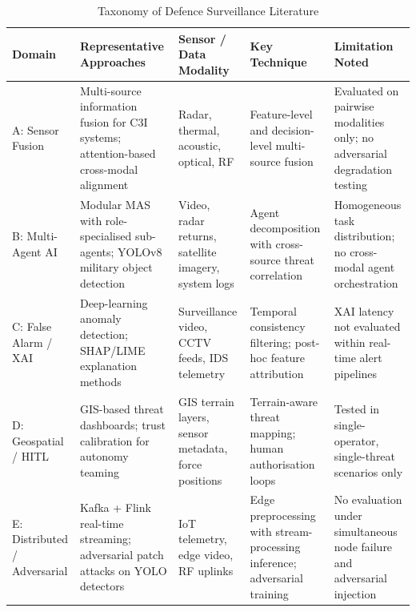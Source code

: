 \begin{table}[!t]
\centering
\caption{Taxonomy of Defence Surveillance Literature}
\label{tab:taxonomy}
\renewcommand{\arraystretch}{1.3}
\footnotesize
\begin{tabular}{>{\raggedright\arraybackslash}p{1.5cm}>{\raggedright\arraybackslash}p{3.6cm}>{\raggedright\arraybackslash}p{2.4cm}>{\raggedright\arraybackslash}p{2.6cm}>{\raggedright\arraybackslash}p{3.8cm}}
\hline
\textbf{Domain} & \textbf{Representative Approaches} & \textbf{Sensor / Data Modality} & \textbf{Key Technique} & \textbf{Limitation Noted} \\
\hline
A: Sensor Fusion
  & Multi-source information fusion for C3I systems; attention-based cross-modal alignment
  & Radar, thermal, acoustic, optical, RF
  & Feature-level and decision-level multi-source fusion
  & Evaluated on pairwise modalities only; no adversarial degradation testing \\
\hline
B: Multi-Agent AI
  & Modular MAS with role-specialised sub-agents; YOLOv8 military object detection
  & Video, radar returns, satellite imagery, system logs
  & Agent decomposition with cross-source threat correlation
  & Homogeneous task distribution; no cross-modal agent orchestration \\
\hline
C: False Alarm / XAI
  & Deep-learning anomaly detection; SHAP/LIME explanation methods
  & Surveillance video, CCTV feeds, IDS telemetry
  & Temporal consistency filtering; post-hoc feature attribution
  & XAI latency not evaluated within real-time alert pipelines \\
\hline
D: Geospatial / HITL
  & GIS-based threat dashboards; trust calibration for autonomy teaming
  & GIS terrain layers, sensor metadata, force positions
  & Terrain-aware threat mapping; human authorisation loops
  & Tested in single-operator, single-threat scenarios only \\
\hline
E: Distributed / Adversarial
  & Kafka + Flink real-time streaming; adversarial patch attacks on YOLO detectors
  & IoT telemetry, edge video, RF uplinks
  & Edge preprocessing with stream-processing inference; adversarial training
  & No evaluation under simultaneous node failure and adversarial injection \\
\hline
\end{tabular}
\end{table}
